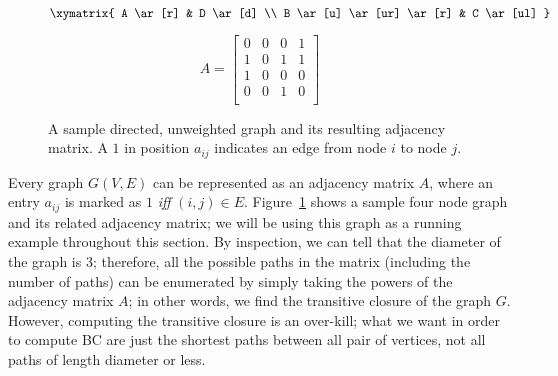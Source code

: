 \begin{figure}
\begin{minipage}{0.20\textwidth}
\begin{center}
\begin{displaymath}
\xymatrix{
A \ar[r] & D \ar[d] \\
B \ar[u] \ar[ur] \ar[r] & C \ar[ul]
}
\end{displaymath}
\end{center}
\end{minipage}
\hspace{10pt}
\begin{minipage}{0.18\textwidth}
\begin{center}
\begin{displaymath}
A = \left[ \begin{array}{cccc}
  0 & 0 & 0 & 1 \\
  1 & 0 & 1 & 1 \\
  1 & 0 & 0 & 0 \\
  0 & 0 & 1 & 0 \\
\end{array} \right]
\end{displaymath}
\end{center}
\end{minipage}
\caption{A sample directed, unweighted graph and its resulting adjacency
matrix. A $1$ in position $a_{ij}$ indicates an edge from node $i$ to node
$j$.}
\label{fig:sample}
\end{figure}

Every graph $G(V,E)$ can be represented as an adjacency matrix $A$, where an 
entry $a_{ij}$ is marked as $1$ \textit{iff} $(i,j)\in{}E$.
%
Figure~\ref{fig:sample} shows a sample four node graph and its related 
adjacency matrix; we will be using this graph as a running example throughout
this section.
%
By inspection, we can tell that the diameter of the graph is $3$; therefore, 
all the possible paths in the matrix (including the number of paths) can be 
enumerated by simply taking the powers of the adjacency matrix $A$; in other 
words, we find the transitive closure of the graph $G$.
%
However, computing the transitive closure is an over-kill; what we want in 
order to compute BC are just the shortest paths between all pair of vertices,
not all paths of length diameter or less.


